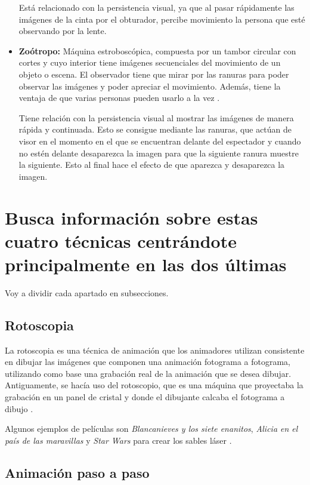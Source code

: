 \documentclass{article}
\begin{document}
\begin{itemize}
    Está relacionado con la persistencia visual, ya que al pasar rápidamente las imágenes de la cinta por el obturador, percibe movimiento la persona que esté observando por la lente. 

    \item \textbf{Zoótropo: }Máquina estroboscópica, compuesta por un tambor circular con cortes y cuyo interior tiene imágenes secuenciales del movimiento de un objeto o escena. El observador tiene que mirar por las ranuras para poder observar las imágenes y poder apreciar el movimiento. Además, tiene la ventaja de que varias personas pueden usarlo a la vez \cite{zoo}.
    
    Tiene relación con la persistencia visual al mostrar las imágenes de manera rápida y continuada. Esto se consigue mediante las ranuras, que actúan de visor en el momento en el que se encuentran delante del espectador y cuando no estén delante desaparezca la imagen para que la siguiente ranura muestre la siguiente. Esto al final hace el efecto de que aparezca y desaparezca la imagen.
\end{itemize}


\section{Busca información sobre estas cuatro técnicas centrándote principalmente en las dos últimas}

Voy a dividir cada apartado en subsecciones.

\subsection{Rotoscopia}

La rotoscopia es una técnica de animación que los animadores utilizan consistente en dibujar las imágenes que componen una animación fotograma a fotograma, utilizando como base una grabación real de la animación que se desea dibujar. Antiguamente, se hacía uso del rotoscopio, que es una máquina que proyectaba la grabación en un panel de cristal y donde el dibujante calcaba el fotograma a dibujo \cite{rotos}.

\bigskip

Algunos ejemplos de películas son \textit{Blancanieves y los siete enanitos}, \textit{Alicia en el país de las maravillas} \cite{pelis} y \textit{Star Wars} para crear los sables láser \cite{rotos}.

\subsection{Animación paso a paso}
\end{document}
